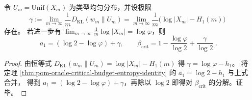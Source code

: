 \begin{theorem}\label{thm:pom-oracle-critical-budget-zeckendorf-plus-gap}
令 \(U_m=\mathrm{Unif}(X_m)\) 为类型均匀分布，并设极限
\[
\gamma:=\lim_{m\to\infty}\frac{1}{m}D_{\mathrm{KL}}(w_m\|U_m)
=\lim_{m\to\infty}\frac{1}{m}\bigl(\log|X_m|-H_1(m)\bigr)
\]
存在。
若进一步有 \(\lim_{m\to\infty}\frac{1}{m}\log|X_m|=\log\varphi\)，则
\[
\boxed{\;
a_1=(\log 2-\log\varphi)+\gamma,\qquad
\beta_{\mathrm{crit}}=1-\frac{\log\varphi}{\log 2}+\frac{\gamma}{\log 2}\; } .
\]
\end{theorem}
\begin{proof}
由恒等式 \(D_{\mathrm{KL}}(w_m\|U_m)=\log|X_m|-H_1(m)\) 得
\(
\gamma=\log\varphi-h_1
\)。
将定理 \ref{thm:pom-oracle-critical-budget-entropy-identity} 的 \(a_1=\log 2-h_1\) 与上式合并，
得到 \(a_1=(\log 2-\log\varphi)+\gamma\)，再除以 \(\log 2\) 即得对 \(\beta_{\mathrm{crit}}\) 的分解。证毕。
\end{proof}

\endinput
